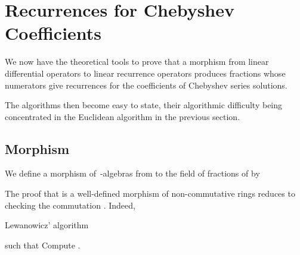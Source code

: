 \documentclass{amsart}
\theoremstyle{definition}
\begin{document}
\section{Recurrences for Chebyshev Coefficients}\label{sec:Chebyshev}
We now have the theoretical tools to prove that a morphism from linear differential operators to linear recurrence operators produces fractions whose numerators give recurrences for the coefficients of Chebyshev series solutions. 

The algorithms then become easy to state, their algorithmic difficulty being concentrated in the Euclidean algorithm in the previous section.

\subsection{Morphism}
We define a morphism of~-algebras from  to the field of fractions of  by

The proof that  is a well-defined morphism of non-commutative rings reduces to checking the commutation . Indeed,


\begin{algorithm}[t]
	\caption{Lewanowicz' algorithm\label{algo:Lewanowicz}}
	\begin{algorithmic}
		\REQUIRE 
		\ENSURE  such that 
		\STATE 
		\STATE 
			\STATE Compute .
			\STATE 
			\STATE 
		\ENDFOR
		\RETURN 
	\end{algorithmic}
\end{algorithm}
\end{document}
